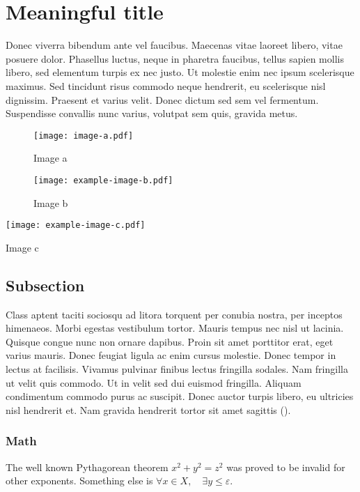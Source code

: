 \documentclass{jcls}
\begin{document}
\section{Meaningful title}

Donec viverra bibendum ante vel faucibus. Maecenas vitae laoreet libero, vitae posuere dolor. Phasellus luctus, neque in pharetra faucibus, tellus sapien mollis libero, sed elementum turpis ex nec justo. Ut molestie enim nec ipsum scelerisque maximus. Sed tincidunt risus commodo neque hendrerit, eu scelerisque nisl dignissim. Praesent et varius velit. Donec dictum sed sem vel fermentum. Suspendisse convallis nunc varius, volutpat sem quis, gravida metus.

\begin{figure}
	\texttt{[image: image-a.pdf]}
	\caption{Image a}
\end{figure}
%
%
%
%


\begin{figure*}
	\texttt{[image: example-image-b.pdf]}
	\caption{Image b}
\end{figure*}

\begin{fullwidthfigure}
	\texttt{[image: example-image-c.pdf]}
	\caption{Image c}
\end{fullwidthfigure}


\subsection{Subsection}

Class aptent taciti sociosqu ad litora torquent per conubia nostra, per inceptos himenaeos. Morbi egestas vestibulum tortor. Mauris tempus nec nisl ut lacinia. Quisque congue nunc non ornare dapibus. Proin sit amet porttitor erat, eget varius mauris. Donec feugiat ligula ac enim cursus molestie. Donec tempor in lectus at facilisis. Vivamus pulvinar finibus lectus fringilla sodales. Nam fringilla ut velit quis commodo. Ut in velit sed dui euismod fringilla. Aliquam condimentum commodo purus ac suscipit. Donec auctor turpis libero, eu ultricies nisl hendrerit et. Nam gravida hendrerit tortor sit amet sagittis (\cite{dirac}).

\subsubsection{Math}

The well known Pythagorean theorem $x^2 + y^2 = z^2$ was proved to be
invalid for other exponents. Something else is
\(\forall x \in X, \quad \exists y \leq ε\).
\end{document}

